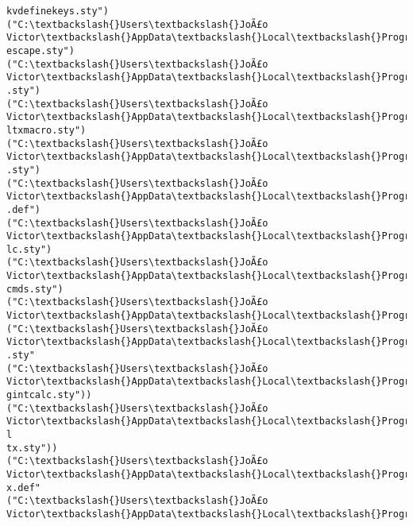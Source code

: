 \documentclass[11pt]{article}
\begin{document}
\begin{Verbatim}[commandchars=\\\{\}]
kvdefinekeys.sty")
("C:\textbackslash{}Users\textbackslash{}JoÃ£o Victor\textbackslash{}AppData\textbackslash{}Local\textbackslash{}Programs\textbackslash{}MiKTeX\textbackslash{}tex/generic/pdfescape\textbackslash{}pdf
escape.sty")
("C:\textbackslash{}Users\textbackslash{}JoÃ£o Victor\textbackslash{}AppData\textbackslash{}Local\textbackslash{}Programs\textbackslash{}MiKTeX\textbackslash{}tex/latex/hycolor\textbackslash{}hycolor
.sty")
("C:\textbackslash{}Users\textbackslash{}JoÃ£o Victor\textbackslash{}AppData\textbackslash{}Local\textbackslash{}Programs\textbackslash{}MiKTeX\textbackslash{}tex/latex/letltxmacro\textbackslash{}let
ltxmacro.sty")
("C:\textbackslash{}Users\textbackslash{}JoÃ£o Victor\textbackslash{}AppData\textbackslash{}Local\textbackslash{}Programs\textbackslash{}MiKTeX\textbackslash{}tex/latex/auxhook\textbackslash{}auxhook
.sty")
("C:\textbackslash{}Users\textbackslash{}JoÃ£o Victor\textbackslash{}AppData\textbackslash{}Local\textbackslash{}Programs\textbackslash{}MiKTeX\textbackslash{}tex/latex/hyperref\textbackslash{}pd1enc
.def")
("C:\textbackslash{}Users\textbackslash{}JoÃ£o Victor\textbackslash{}AppData\textbackslash{}Local\textbackslash{}Programs\textbackslash{}MiKTeX\textbackslash{}tex/generic/intcalc\textbackslash{}intca
lc.sty")
("C:\textbackslash{}Users\textbackslash{}JoÃ£o Victor\textbackslash{}AppData\textbackslash{}Local\textbackslash{}Programs\textbackslash{}MiKTeX\textbackslash{}tex/generic/etexcmds\textbackslash{}etex
cmds.sty")
("C:\textbackslash{}Users\textbackslash{}JoÃ£o Victor\textbackslash{}AppData\textbackslash{}Local\textbackslash{}Programs\textbackslash{}MiKTeX\textbackslash{}tex/latex/url\textbackslash{}url.sty")
("C:\textbackslash{}Users\textbackslash{}JoÃ£o Victor\textbackslash{}AppData\textbackslash{}Local\textbackslash{}Programs\textbackslash{}MiKTeX\textbackslash{}tex/generic/bitset\textbackslash{}bitset
.sty"
("C:\textbackslash{}Users\textbackslash{}JoÃ£o Victor\textbackslash{}AppData\textbackslash{}Local\textbackslash{}Programs\textbackslash{}MiKTeX\textbackslash{}tex/generic/bigintcalc\textbackslash{}bi
gintcalc.sty"))
("C:\textbackslash{}Users\textbackslash{}JoÃ£o Victor\textbackslash{}AppData\textbackslash{}Local\textbackslash{}Programs\textbackslash{}MiKTeX\textbackslash{}tex/latex/base\textbackslash{}atbegshi-l
tx.sty"))
("C:\textbackslash{}Users\textbackslash{}JoÃ£o Victor\textbackslash{}AppData\textbackslash{}Local\textbackslash{}Programs\textbackslash{}MiKTeX\textbackslash{}tex/latex/hyperref\textbackslash{}hpdfte
x.def"
("C:\textbackslash{}Users\textbackslash{}JoÃ£o Victor\textbackslash{}AppData\textbackslash{}Local\textbackslash{}Programs\textbackslash{}MiKTeX\textbackslash{}tex/latex/base\textbackslash{}atveryend-

\end{Verbatim}
\end{document}
